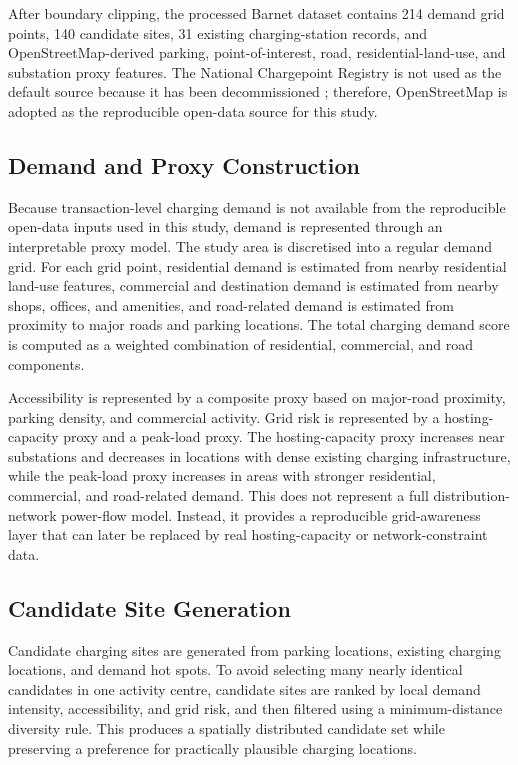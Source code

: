 After boundary clipping, the processed Barnet dataset contains 214 demand grid points, 140 candidate sites, 31 existing charging-station records, and OpenStreetMap-derived parking, point-of-interest, road, residential-land-use, and substation proxy features. The National Chargepoint Registry is not used as the default source because it has been decommissioned \cite{govukNCR}; therefore, OpenStreetMap is adopted as the reproducible open-data source for this study.

\subsection{Demand and Proxy Construction}
Because transaction-level charging demand is not available from the reproducible open-data inputs used in this study, demand is represented through an interpretable proxy model. The study area is discretised into a regular demand grid. For each grid point, residential demand is estimated from nearby residential land-use features, commercial and destination demand is estimated from nearby shops, offices, and amenities, and road-related demand is estimated from proximity to major roads and parking locations. The total charging demand score is computed as a weighted combination of residential, commercial, and road components.

Accessibility is represented by a composite proxy based on major-road proximity, parking density, and commercial activity. Grid risk is represented by a hosting-capacity proxy and a peak-load proxy. The hosting-capacity proxy increases near substations and decreases in locations with dense existing charging infrastructure, while the peak-load proxy increases in areas with stronger residential, commercial, and road-related demand. This does not represent a full distribution-network power-flow model. Instead, it provides a reproducible grid-awareness layer that can later be replaced by real hosting-capacity or network-constraint data.

\subsection{Candidate Site Generation}
Candidate charging sites are generated from parking locations, existing charging locations, and demand hot spots. To avoid selecting many nearly identical candidates in one activity centre, candidate sites are ranked by local demand intensity, accessibility, and grid risk, and then filtered using a minimum-distance diversity rule. This produces a spatially distributed candidate set while preserving a preference for practically plausible charging locations.


